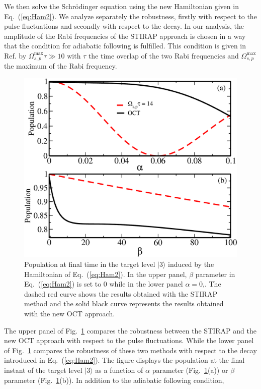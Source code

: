 \documentclass[]{interact}
\theoremstyle{plain}%
\theoremstyle{definition}
\theoremstyle{remark}
\begin{document}
We then solve the Schr\"odinger equation using the new Hamiltonian given in 
Eq.~(\ref{eq:Ham2}). We analyze separately the robustness, firstly with respect 
to the pulse fluctuations and secondly with respect to the decay. 
In our analysis, the amplitude of the Rabi frequencies of the STIRAP approach 
is 
chosen in a way that the condition for adiabatic following
is fulfilled. This condition is given in Ref. \cite{Bergmann} by 
$\Omega_{s,p}^{\mathrm{max}}\tau\gg 10$
with $\tau$ the time overlap of the two Rabi frequencies and
$\Omega_{s,p}^{\mathrm{max}}$ the maximum of the Rabi frequency.  
\begin{figure}[h!]
\centering
\includegraphics[width=0.7\linewidth]{Figure8}
\caption{Population at final time in the target level $|3\rangle$ induced 
by the Hamiltonian of Eq.~(\ref{eq:Ham2}). 
In the upper panel, $\beta$ parameter in  Eq.~(\ref{eq:Ham2}) is set to 0 
while in the lower panel $\alpha=0$,.
The dashed red curve shows the results obtained with the STIRAP method and the 
solid black curve represents the results 
obtained with the new OCT approach.}
\label{fig:pop_robustness_energy}
\end{figure}
The upper panel of Fig.~\ref{fig:pop_robustness_energy} compares the robustness
between the STIRAP and the new OCT approach with respect to the pulse 
fluctuations. While the lower panel of  Fig.~\ref{fig:pop_robustness_energy} 
compares the robustness of these two methods with respect 
to the decay introduced in Eq.~(\ref{eq:Ham2}). 
The figure displays the population at the final instant of the 
target level $|3\rangle$  as a function of $\alpha$ parameter 
(Fig.~\ref{fig:pop_robustness_energy}(a)) 
or $\beta$ parameter (Fig.~\ref{fig:pop_robustness_energy}(b)).
In addition to the adiabatic following condition, 
\end{document}
